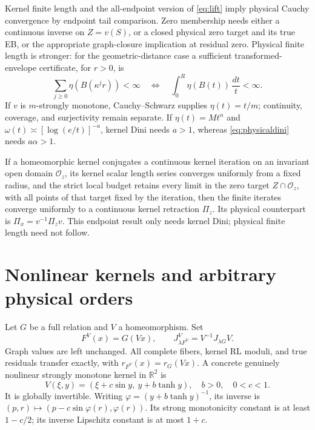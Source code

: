 \documentclass[11pt]{article}
\theoremstyle{remark}
\begin{document}
Kernel finite length and the all-endpoint version of \eqref{eq:lift} imply physical Cauchy convergence
by endpoint tail comparison. Zero membership needs either a continuous
inverse on $Z=v(S)$, or a closed physical zero target and its true EB,
or the appropriate graph-closure implication at residual zero. Physical
finite length is stronger: for the geometric-distance case a sufficient
transformed-envelope certificate, for $r>0$, is
\begin{equation}\label{eq:physicaldini}
 \sum_{j\ge0}\eta(B(\kappa^jr))<\infty
 \quad\Longleftrightarrow\quad
 \int_0^R\eta(B(t))\,\frac{dt}{t}<\infty.
\end{equation}
If $v$ is $m$-strongly monotone, Cauchy--Schwarz supplies
$\eta(t)=t/m$; continuity, coverage, and surjectivity remain separate.
If $\eta(t)=Mt^\alpha$ and $\omega(t)\asymp[\log(e/t)]^{-a}$,
kernel Dini needs $a>1$, whereas \eqref{eq:physicaldini} needs
$a\alpha>1$.

If a homeomorphic kernel conjugates a continuous kernel iteration on
an invariant open domain $\mathcal O_z$, its kernel scalar length series
converges uniformly from a fixed radius, and the strict local budget
retains every limit in the zero target $Z\cap\mathcal O_z$, with all
points of that target fixed by the iteration, then
the finite iterates converge uniformly to a continuous kernel retraction
$\Pi_z$. Its physical counterpart is
$\Pi_x=v^{-1}\Pi_zv$. This endpoint result only needs kernel Dini;
physical finite length need not follow.

\section{Nonlinear kernels and arbitrary physical orders}
Let $G$ be a full relation and $V$ a homeomorphism. Set
\begin{equation}\label{eq:conjugate}
 F^V(x)=G(Vx),\qquad
 J_{\lambda F^V}^V=V^{-1}J_{\lambda G}V.
\end{equation}
Graph values are left unchanged. All complete fibers, kernel RL moduli,
and true residuals transfer exactly, with
$r_{F^V}(x)=r_G(Vx)$.
A concrete genuinely nonlinear strongly monotone kernel in $\mathbb R^2$ is
\begin{equation}\label{eq:nonlinearkernel}
 V(\xi,y)=(\xi+c\sin y,\ y+b\tanh y),\quad b>0,\quad0<c<1.
\end{equation}
It is globally invertible. Writing $\varphi=(y+b\tanh y)^{-1}$,
its inverse is $(p,r)\mapsto(p-c\sin\varphi(r),\varphi(r))$.
Its strong monotonicity constant is at least $1-c/2$; its inverse
Lipschitz constant is at most $1+c$.
\end{document}
